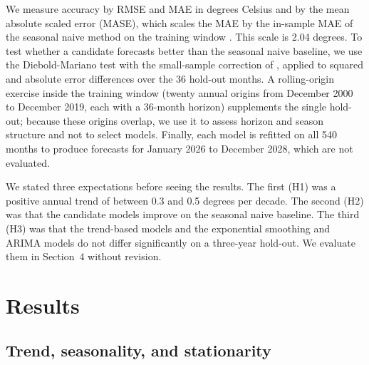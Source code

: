 We measure accuracy by RMSE and MAE in degrees Celsius and by the mean absolute scaled error (MASE), which scales the MAE by the in-sample MAE of the seasonal naive method on the training window \citep{hyndman2006another}. This scale is 2.04 degrees.
To test whether a candidate forecasts better than the seasonal naive baseline, we use the Diebold-Mariano test \citep{diebold1995comparing} with the small-sample correction of \citet{harvey1997testing}, applied to squared and absolute error differences over the 36 hold-out months. A rolling-origin exercise inside the training window (twenty annual origins from December 2000 to December 2019, each with a 36-month horizon) supplements the single hold-out; because these origins overlap, we use it to assess horizon and season structure and not to select models. Finally, each model is refitted on all 540 months to produce forecasts for January 2026 to December 2028, which are not evaluated.

We stated three expectations before seeing the results. The first (H1) was a positive annual trend of between 0.3 and 0.5 degrees per decade. The second (H2) was that the candidate models improve on the seasonal naive baseline. The third (H3) was that the trend-based models and the exponential smoothing and ARIMA models do not differ significantly on a three-year hold-out. We evaluate them in Section~4 without revision.

\section{Results}

\subsection{Trend, seasonality, and stationarity}

